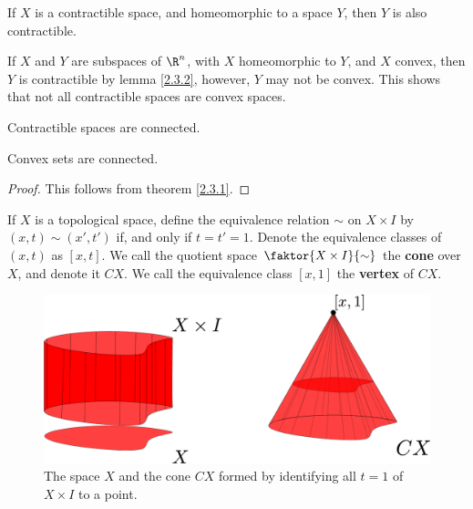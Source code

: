 \begin{lemma}\label{2.3.2}
    If $X$ is a contractible space, and homeomorphic to a space  $Y$, then  $Y$
    is also contractible.
\end{lemma}

\begin{example}\label{3.6}
    If $X$ and  $Y$ are subspaces of  $\R^n$, with $X$ homeomorphic to $Y$, and
     $X$ convex, then  $Y$ is contractible by lemma \ref{2.3.2}, however, $Y$
     may not be convex. This shows that not all contractible spaces are convex
     spaces.
\end{example}

\begin{lemma}\label{2.3.3}
    Contractible spaces are connected.
\end{lemma}
\begin{corollary}
    Convex sets are connected.
\end{corollary}
\begin{proof}
    This follows from theorem \ref{2.3.1}.
\end{proof}

\begin{definition}
    If $X$ is a topological space, define the equivalence relation  $\sim$ on
    $X \times I$ by  $(x,t) \sim (x',t')$ if, and only if $t=t'=1$. Denote the
    equivalence classes of  $(x,t)$ as $[x,t]$. We call the quotient space
    $\faktor{X \times I}{\sim}$ the \textbf{cone} over $X$, and denote it  $CX$.
    We call the equivalence class  $[x,1]$ the \textbf{vertex} of $CX$.
\end{definition}

\begin{figure}[h]
    \centering
    \includegraphics[scale=0.2]{Figures/Chapter3/cone.eps}
    \caption{The space $X$ and the cone $CX$ formed by identifying all $t=1$ of
    $X \times I$ to a point.}
    \label{fig_3.1}
\end{figure}

